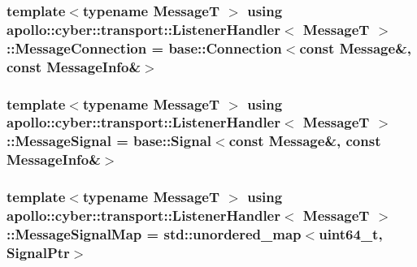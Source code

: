 \hypertarget{classapollo_1_1cyber_1_1transport_1_1ListenerHandler_a6f33e5f36f457a51129671f22c159ddf}{
\subsubsection[{Message\-Connection}]{\setlength{\rightskip}{0pt plus 5cm}template$<$typename Message\-T $>$ using {\bf apollo\-::cyber\-::transport\-::\-Listener\-Handler}$<$ Message\-T $>$\-::{\bf Message\-Connection} =  {\bf base\-::\-Connection}$<$const {\bf Message}\&, const {\bf Message\-Info}\&$>$}}\label{classapollo_1_1cyber_1_1transport_1_1ListenerHandler_a6f33e5f36f457a51129671f22c159ddf}
\hypertarget{classapollo_1_1cyber_1_1transport_1_1ListenerHandler_a9ca5ce35c021aae1145e8e25a5fda0a0}{
\subsubsection[{Message\-Signal}]{\setlength{\rightskip}{0pt plus 5cm}template$<$typename Message\-T $>$ using {\bf apollo\-::cyber\-::transport\-::\-Listener\-Handler}$<$ Message\-T $>$\-::{\bf Message\-Signal} =  {\bf base\-::\-Signal}$<$const {\bf Message}\&, const {\bf Message\-Info}\&$>$}}\label{classapollo_1_1cyber_1_1transport_1_1ListenerHandler_a9ca5ce35c021aae1145e8e25a5fda0a0}
\hypertarget{classapollo_1_1cyber_1_1transport_1_1ListenerHandler_ab534f02021dc0d897b0f1161a604b835}{
\subsubsection[{Message\-Signal\-Map}]{\setlength{\rightskip}{0pt plus 5cm}template$<$typename Message\-T $>$ using {\bf apollo\-::cyber\-::transport\-::\-Listener\-Handler}$<$ Message\-T $>$\-::{\bf Message\-Signal\-Map} =  std\-::unordered\-\_\-map$<$uint64\-\_\-t, {\bf Signal\-Ptr}$>$\hspace{0.3cm}{\ttfamily [private]}}}\label{classapollo_1_1cyber_1_1transport_1_1ListenerHandler_ab534f02021dc0d897b0f1161a604b835}
